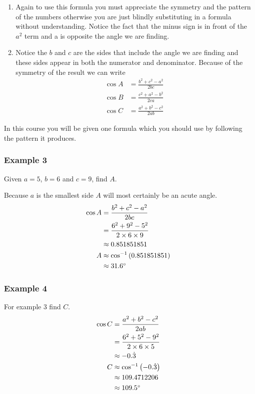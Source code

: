 \begin{enumerate}
\item Again to use this formula you must appreciate the symmetry and the pattern of the numbers otherwise you are
just blindly substituting in a formula without understanding. Notice the fact that the minus sign is in front
of the $a^{2}$ term and a is opposite the angle we are finding. 

\item Notice the $b$ and $c$ are the sides that include the angle we are finding and these sides appear in both the numerator and denominator. Because
of the symmetry of the result we can write
\begin{align*}\cos  A &  = \frac{b^{2} +c^{2} -a^{2}}{2 b c} \\
\cos  B &  = \frac{c^{2} +a^{2} -b^{2}}{2 c a} \\
\cos  C &  = \frac{a^{2} +b^{2} -c^{2}}{2 a b}\end{align*}\end{enumerate}


In this course you will be given one formula which
you should use by following the pattern it produces. 

\subsubsection{Example 3}
Given $a =5$, $b =6$ and $c =9$, find $A$. 

Because $a$ is the smallest side $A$ will most certainly be an acute angle.
\begin{align*}\cos  A &  = \frac{b^{2} +c^{2} -a^{2}}{2 b c} \\
 &  = \frac{6^{2} +9^{2} -5^{2}}{2 \times 6 \times 9} \\
 &  \approx 0.851851851 \\
A &  \approx \cos ^{ -1} \left (0.851851851\right ) \\
 &  \approx 31.6 \mbox{{\ensuremath{{}^\circ}}}\end{align*}

\subsubsection{Example 4}
For example 3 find $C$.
\begin{align*}\cos  C &  = \frac{a^{2} +b^{2} -c^{2}}{2 a b} \\
 &  = \frac{6^{2} +5^{2} -9^{2}}{2 \times 6 \times 5} \\
 &  \approx  -0. \dot{3} \\
C &  \approx \cos ^{ -1} \left ( -0. \dot{3}\right ) \\
 &  \approx 109.4712206 \\
 &  \approx 109.5 \mbox{{\ensuremath{{}^\circ}}}\end{align*}

